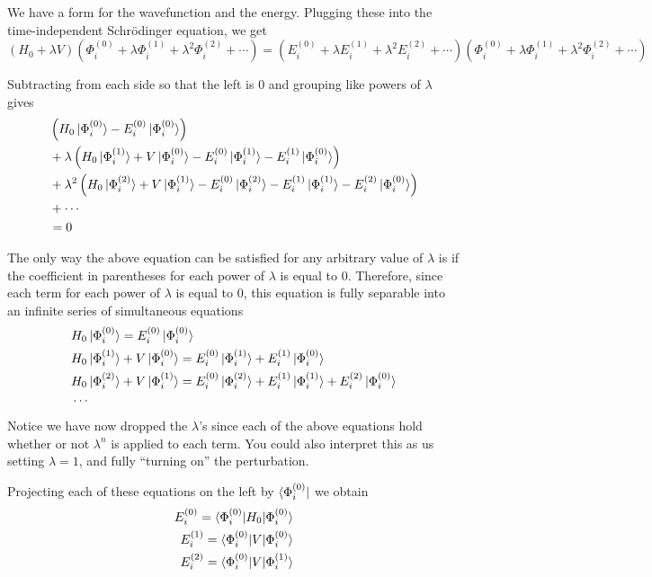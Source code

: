 \documentclass{article}
\newcommand{\lam}{\lambda}
\begin{document}
We have a form for the wavefunction and the energy. Plugging these 
into the time-independent Schr{\"o}dinger equation, we get 
\[
(H_0 + \lam V) (\Phi_i^{(0)} +  \lam \Phi_i^{(1)} + \lam^2 \Phi_i^{(2)} + \cdots)
=  (E_i^{(0)} +  \lam E_i^{(1)} + \lam^2 E_i^{(2)}  + \cdots ) (\Phi_i^{(0)} +  \lam \Phi_i^{(1)} + \lam^2 \Phi_i^{(2)} + \cdots)
 \]

Subtracting from each side so that the left is 0 and grouping like powers of $\lam$ gives
\begin{align*}
&  \left(H_0 \ket{\Phi_i^{(0)}} - E_i^{(0)} \ket{\Phi_i^{(0)}}   \right) \\
&+ \lam \left( H_0\ket{\Phi_i^{(1)}} + V\ket{\Phi_i^{(0)}} - E_i^{(0)}\ket{\Phi_i^{(1)}} - E_i^{(1)}\ket{\Phi_i^{(0)}} \right)  \\
&+ \lam^2 \left( H_0 \ket{\Phi_i^{(2)}} + V \ket{\Phi_i^{(1)}} - E_i^{(0)} \ket{\Phi_i^{(2)}} - E_i^{(1)} \ket{\Phi_i^{(1)}} - E_i^{(2)} \ket{\Phi_i^{(0)}}  \right)  \\
&+ \cdots \\ 
&= 0
\end{align*}

The only way the above equation can be satisfied for any arbitrary value of $\lam$ is 
    if the coefficient in parentheses for each power of $\lam$ is equal to 0.
Therefore, since each term for each power of $\lam$ is equal to 0,
    this equation is fully separable into an infinite series of simultaneous equations
\begin{align*}
&  H_0 \ket{\Phi_i^{(0)}} = E_i^{(0)} \ket{\Phi_i^{(0)}}   \\
&  H_0\ket{\Phi_i^{(1)}} + V\ket{\Phi_i^{(0)}} = E_i^{(0)}\ket{\Phi_i^{(1)}} + E_i^{(1)}\ket{\Phi_i^{(0)}}  \\
&  H_0 \ket{\Phi_i^{(2)}} + V \ket{\Phi_i^{(1)}} = E_i^{(0)} \ket{\Phi_i^{(2)}} + E_i^{(1)} \ket{\Phi_i^{(1)}} + E_i^{(2)} \ket{\Phi_i^{(0)}}  \\
& \cdots \\ 
\end{align*}
Notice we have now dropped the $\lam$'s since each of the above equations hold whether or not $\lam^n$ is applied to each term.
You could also interpret this as us setting $\lam=1$, and fully ``turning on'' the perturbation.

Projecting each of these equations on the left by $\bra{\Phi_i^{(0)}}$ we obtain
\begin{align*}
E_i^{(0)} = \braket{\Phi_i^{(0)} | H_0 | \Phi_i^{(0)}} \\
E_i^{(1)} = \braket{\Phi_i^{(0)} | V | \Phi_i^{(0)}} \\
E_i^{(2)} = \braket{\Phi_i^{(0)} | V | \Phi_i^{(1)}} \\
\end{align*}
\end{document}
